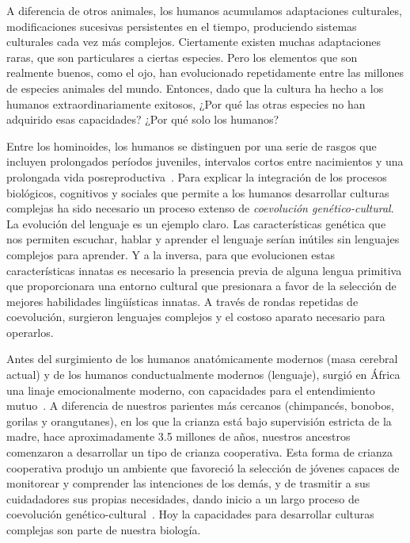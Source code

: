 \documentclass[a4paper,11pt]{book}
\theoremstyle{definition}
\begin{document}

A diferencia de otros animales, los humanos acumulamos adaptaciones culturales, modificaciones sucesivas persistentes en el tiempo, produciendo sistemas culturales cada vez más complejos.
%
Ciertamente existen muchas adaptaciones raras, que son particulares a ciertas especies.
%
Pero los elementos que son realmente buenos, como el ojo, han evolucionado repetidamente entre las millones de especies animales del mundo.
%
Entonces, dado que la cultura ha hecho a los humanos extraordinariamente exitosos, ¿Por qué las otras especies no han adquirido esas capacidades?
%
¿Por qué solo los humanos?


Entre los hominoides, los humanos se distinguen por una serie de rasgos que incluyen prolongados períodos juveniles, intervalos cortos entre nacimientos y una prolongada vida posreproductiva~\cite{Jones2011}.
%
Para explicar la integración de los procesos biológicos, cognitivos y sociales que permite a los humanos desarrollar culturas complejas ha sido necesario un proceso extenso de \emph{coevolución genético-cultural}.
%
%
La evolución del lenguaje es un ejemplo claro.
%
Las características genética que nos permiten escuchar, hablar y aprender el lenguaje serían inútiles sin lenguajes complejos para aprender.
%
Y a la inversa, para que evolucionen estas características innatas es necesario la presencia previa de alguna lengua primitiva que proporcionara una entorno cultural que presionara a favor de la selección de mejores habilidades lingüísticas innatas.
%
A través de rondas repetidas de coevolución, surgieron lenguajes complejos y el costoso aparato necesario para operarlos.


Antes del surgimiento de los humanos anatómicamente modernos (masa cerebral actual) y de los humanos conductualmente modernos (lenguaje), surgió en África una linaje emocionalmente moderno, con capacidades para el entendimiento mutuo~\cite{hrdy2020-emotionallyModern}.
%
A diferencia de nuestros parientes más cercanos (chimpancés, bonobos, gorilas y orangutanes), en los que la crianza está bajo supervisión estricta de la madre, hace aproximadamente 3.5 millones de años, nuestros ancestros comenzaron a desarrollar un tipo de crianza cooperativa.
%
Esta forma de crianza cooperativa produjo un ambiente que favoreció la selección de jóvenes capaces de monitorear y comprender las intenciones de los demás, y de trasmitir a sus cuidadadores sus propias necesidades, dando inicio a un largo proceso de coevolución genético-cultural~\cite{hrdy2020-emotionallyModern}.
%
Hoy la capacidades para desarrollar culturas complejas son parte de nuestra biología.
\end{document}
